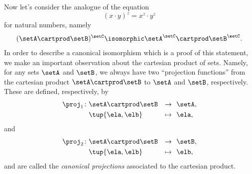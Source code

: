 Now let's consider the analogue of the equation
\begin{equation}
    (x \cdot y)^z = x^z \cdot y^z
\end{equation}
for natural numbers, namely
\begin{equation}
    (\setA \cartprod \setB)^{\setC}  \isomorphic  \setA^\setC \cartprod \setB^\setC.
\end{equation}
In order to describe a canonical isomorphism which is a proof of this statement, we make an important observation about the cartesian product of sets.
Namely, for any sets $\setA$ and $\setB$, we always have two ``projection functions'' from the cartesian product $\setA \cartprod \setB$ to $\setA$ and $\setB$, respectively.
These are defined, respectively, by
\begin{equation}
    \begin{aligned}
        \proj_1 \colon & \setA \cartprod \setB & \to     & \ \ \setA, \\
                       & \tup{\ela, \elb}      & \mapsto & \ \  \ela,
    \end{aligned}
\end{equation}
and
\begin{equation}
    \begin{aligned}
        \proj_2 \colon & \setA \cartprod \setB & \to     & \ \ \setB, \\
                       & \tup{\ela, \elb}      & \mapsto & \ \  \elb,
    \end{aligned}
\end{equation}
and are called the \emph{canonical projections} associated to the cartesian product.

